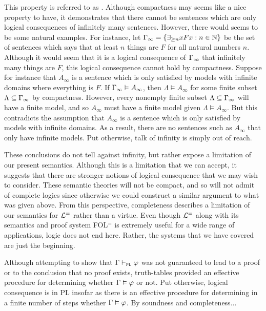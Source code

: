 This property is referred to as .
Although compactness may seems like a nice property to have, it demonstrates that there cannot be sentences which are only logical consequences of infinitely many sentences.
However, there would seems to be some natural examples.
For instance, let $\Gamma_\infty=\lbrace\exists_{\geq n}xFx:n\in\mathbb{N}\rbrace$ be the set of sentences which says that at least $n$ things are $F$ for all natural numbers $n$. 
Although it would seem that it is a logical consequence of $\Gamma_\infty$ that infinitely many things are $F$, this logical consequence cannot hold by compactness.
Suppose for instance that $A_\infty$ is a sentence which is only satisfied by models with infinite domains where everything is $F$.
If $\Gamma_\infty\vDash A_\infty$, then $\Lambda\models A_\infty$ for some finite subset $\Lambda\subseteq\Gamma_\infty$ by compactness.
However, every nonempty finite subset $\Lambda\subseteq\Gamma_\infty$ will have a finite model, and so $A_\infty$ must have a finite model given $\Lambda\models A_\infty$. 
But this contradicts the assumption that $A_\infty$ is a sentence which is only satisfied by models with infinite domains.
As a result, there are no sentences such as $A_\infty$ that only have infinite models. %
Put otherwise, talk of infinity is simply out of reach.

These conclusions do not tell against infinity, but rather expose a limitation of our present semantics.
Although this is a limitation that we can accept, it suggests that there are stronger notions of logical consequence that we may wish to consider.
These semantic theories will not be compact, and so will not admit of complete logics since otherwise we could construct a similar argument to what was given above.
From this perspective, completeness describes a limitation of our semantics for $\mathcal{L}^{=}$ rather than a virtue.
Even though $\mathcal{L}^{=}$ along with its semantics and proof system FOL$^=$ is extremely useful for a wide range of applications, logic does not end here. 
Rather, the systems that we have covered are just the beginning.



Although attempting to show that $\Gamma \vdash_{\textsc{pl}} \varphi$ was not guaranteed to lead to a proof or to the conclusion that no proof exists, truth-tables provided an effective procedure for determining whether $\Gamma\vDash\varphi$ or not. 
Put otherwise, logical consequence is  in PL insofar as there is an effective procedure for determining in a finite number of steps whether $\Gamma \vDash \varphi$.
By soundness and completeness... %

